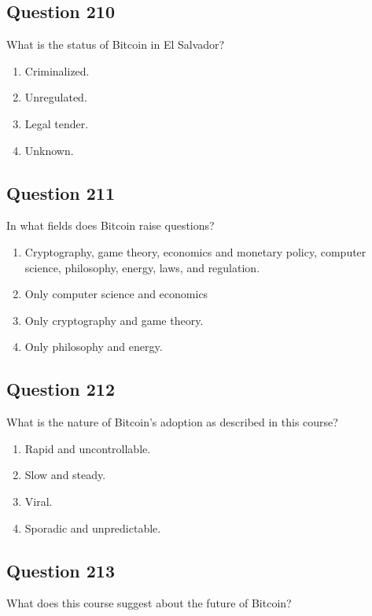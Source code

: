 \documentclass[12pt,a4paper]{article}
\begin{document}
\bigskip


\subsection*{Question 210}
What is the status of Bitcoin in El Salvador?

\begin{enumerate}[label=\Alph*., leftmargin=*]
\item Criminalized.
\item Unregulated.
\item Legal tender.
\item Unknown.
\end{enumerate}

\bigskip


\subsection*{Question 211}
In what fields does Bitcoin raise questions?

\begin{enumerate}[label=\Alph*., leftmargin=*]
\item Cryptography, game theory, economics and monetary policy, computer science, philosophy, energy, laws, and regulation.
\item Only computer science and economics
\item Only cryptography and game theory.
\item Only philosophy and energy.
\end{enumerate}

\bigskip


\subsection*{Question 212}
What is the nature of Bitcoin's adoption as described in this course?

\begin{enumerate}[label=\Alph*., leftmargin=*]
\item Rapid and uncontrollable.
\item Slow and steady.
\item Viral.
\item Sporadic and unpredictable.
\end{enumerate}

\bigskip


\subsection*{Question 213}
What does this course suggest about the future of Bitcoin?
\end{document}
